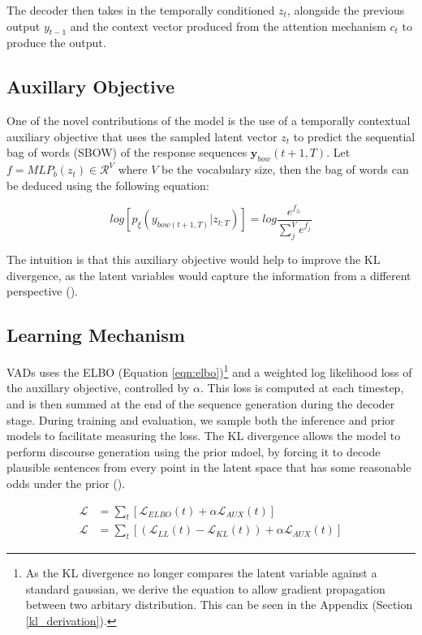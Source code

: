 \documentclass[12pt,twoside]{report}
\begin{document}
The decoder then takes in the temporally conditioned $z_t$, alongside the previous output $y_{t-1}$ and the context vector produced from the attention mechanism $c_t$ to produce the output.

\subsection{Auxillary Objective}
\label{aux_obj}
One of the novel contributions of the model is the use of a temporally contextual auxiliary objective that uses the sampled latent vector $z_t$ to predict the sequential bag of words (SBOW) of the response sequences $\boldsymbol{y}_{bow}(t+1,T)$. Let $f=MLP_b(z_t) \in \mathcal{R}^V$ where $V$ be the vocabulary size, then the bag of words can be deduced using the following equation:

\begin{equation}
	log [p_\xi(y_{bow(t+1,T)}|z_{t:T}) ] = log  \frac{e^{f_{z_{t}}}}{\sum^V_j e^{f_{j}}}
\end{equation}

The intuition is that this auxiliary objective would help to improve the KL divergence, as the latent variables would capture the information from a different perspective (\cite{du_variational_2018}).

\subsection{Learning Mechanism}


VADs uses the ELBO (Equation \ref{eqn:elbo})\footnote{As the KL divergence no longer compares the latent variable against a standard gaussian, we derive the equation to allow gradient propagation between two arbitary distribution. This can be seen in the Appendix (Section \ref{kl_derivation}).} and a weighted log likelihood loss of the auxillary objective, controlled by $\alpha$. This loss is computed at each timestep, and is then summed at the end of the sequence generation during the decoder stage. During training and evaluation, we sample both the inference and prior models to facilitate measuring the loss. The KL divergence allows the model to perform discourse generation using the prior mdoel, by forcing it to decode plausible sentences from every point in the latent space that has some reasonable odds under the prior (\cite{bowman_generating_2015}).

\begin{equation}
	\begin{split}
		\mathcal{L} &= \sum_t [\mathcal{L}_{ELBO}(t) + \alpha \mathcal{L}_{AUX}(t)] \\
		\mathcal{L} &= \sum_t [(\mathcal{L}_{LL}(t) - \mathcal{L}_{KL}(t)) + \alpha \mathcal{L}_{AUX}(t)] 
	\end{split}
\end{equation}
\end{document}
